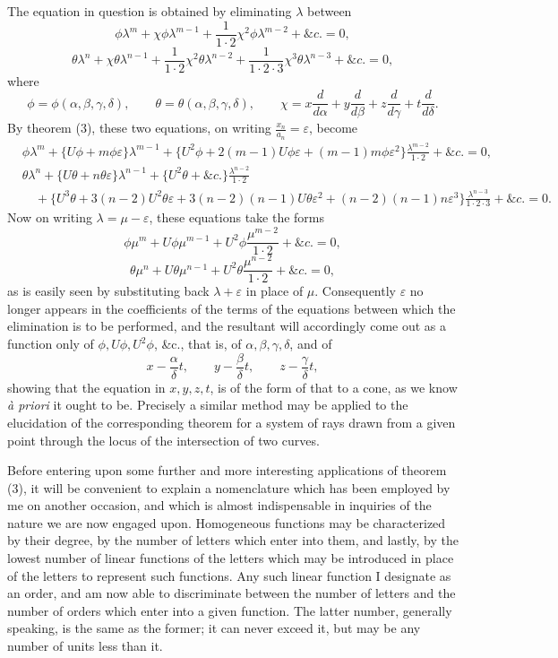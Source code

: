 \documentclass[11pt]{article}
\newcommand{\sourcepage}[1]{\marginpar{\scriptsize p.~#1}}
\newcommand{\eps}{\varepsilon}
\begin{document}
{{The equation in question is obtained by eliminating $\lambda$ between
\[
 \phi\lambda^m+\chi\phi\lambda^{m-1}+\frac{1}{1\cdot2}\chi^2\phi\lambda^{m-2}+\&c.=0,
\]
\[
 \theta\lambda^n+\chi\theta\lambda^{n-1}+\frac{1}{1\cdot2}\chi^2\theta\lambda^{n-2}
 +\frac{1}{1\cdot2\cdot3}\chi^3\theta\lambda^{n-3}+\&c.=0,
\]
\sourcepage{170}
where
\[
 \phi=\phi(\alpha,\beta,\gamma,\delta),\qquad
 \theta=\theta(\alpha,\beta,\gamma,\delta),\qquad
 \chi=x\frac{d}{d\alpha}+y\frac{d}{d\beta}+z\frac{d}{d\gamma}+t\frac{d}{d\delta}.
\]
By theorem (3), these two equations, on writing $\frac{x_n}{a_n}=\eps$, become
\[
\begin{aligned}
&\phi\lambda^m+\{U\phi+m\phi\eps\}\lambda^{m-1}
+\{U^2\phi+2(m-1)U\phi\eps+(m-1)m\phi\eps^2\}\frac{\lambda^{m-2}}{1\cdot2}+\&c.=0,\\
&\theta\lambda^n+\{U\theta+n\theta\eps\}\lambda^{n-1}
+\{U^2\theta+\&c.\}\frac{\lambda^{n-2}}{1\cdot2}\\
&\quad+\{U^3\theta+3(n-2)U^2\theta\eps+3(n-2)(n-1)U\theta\eps^2+(n-2)(n-1)n\eps^3\}\frac{\lambda^{n-3}}{1\cdot2\cdot3}+\&c.=0.
\end{aligned}
\]
Now on writing $\lambda=\mu-\eps$, these equations take the forms
\[
 \phi\mu^m+U\phi\mu^{m-1}+U^2\phi\frac{\mu^{m-2}}{1\cdot2}+\&c.=0,
\]
\[
 \theta\mu^n+U\theta\mu^{n-1}+U^2\theta\frac{\mu^{n-2}}{1\cdot2}+\&c.=0,
\]
as is easily seen by substituting back $\lambda+\eps$ in place of $\mu$. Consequently $\eps$ no longer appears in the coefficients of the terms of the equations between which the elimination is to be performed, and the resultant will accordingly come out as a function only of $\phi,U\phi,U^2\phi$, \&c., that is, of $\alpha,\beta,\gamma,\delta$, and of
\[
 x-\frac{\alpha}{\delta}t,
 \qquad
 y-\frac{\beta}{\delta}t,
 \qquad
 z-\frac{\gamma}{\delta}t,
\]
showing that the equation in $x,y,z,t$, is of the form of that to a cone, as we know \emph{\`a priori} it ought to be. Precisely a similar method may be applied to the elucidation of the corresponding theorem for a system of rays drawn from a given point through the locus of the intersection of two curves.

Before entering upon some further and more interesting applications of theorem (3), it will be convenient to explain a nomenclature which has been employed by me on another occasion, and which is almost indispensable in inquiries of the nature we are now engaged upon. Homogeneous functions may be characterized by their degree, by the number of letters which enter into them, and lastly, by the lowest number of linear functions of the letters which may be introduced in place of the letters to represent such functions. Any such linear function I designate as an order, and am now able to discriminate between the number of letters and the number of orders which enter into a given function. The latter number, generally speaking, is the same as the former; it can never exceed it, but may be any number of units less than it.

}}
\end{document}
